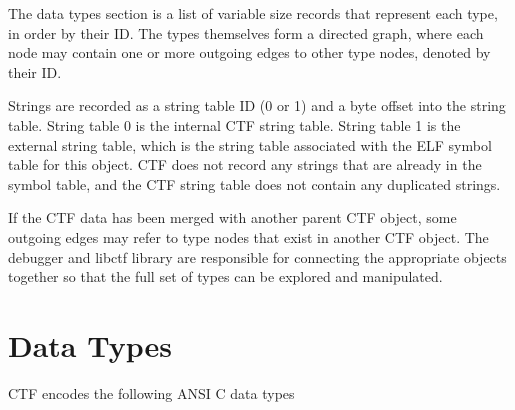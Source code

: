 The data types section is a list of variable size records that
represent each type, in order by their ID.  The types themselves form
a directed graph, where each node may contain one or more outgoing
edges to other type nodes, denoted by their ID.

Strings are recorded as a string table ID (0 or 1) and a byte offset
into the string table.  String table 0 is the internal CTF string
table.  String table 1 is the external string table, which is the
string table associated with the ELF symbol table for this object.
CTF does not record any strings that are already in the symbol table,
and the CTF string table does not contain any duplicated strings.

If the CTF data has been merged with another parent CTF object, some
outgoing edges may refer to type nodes that exist in another CTF
object.  The debugger and libctf library are responsible for
connecting the appropriate objects together so that the full set of
types can be explored and manipulated.


\section{Data Types}
\label{sec:ctf-data-types}

CTF encodes the following ANSI C data types

